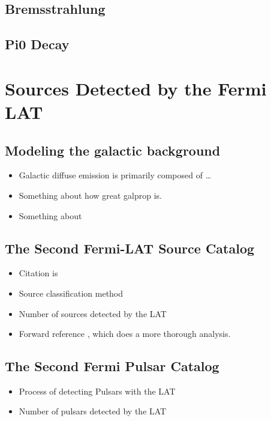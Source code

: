 \subsection{Bremsstrahlung}

\subsection{Pi0 Decay}

\section{Sources Detected by the Fermi LAT}

\subsection{Modeling the galactic background}

\begin{itemize}
  \item Galactic diffuse emission is primarily composed of \ldots
  \item Something about how great galprop is.
  \item Something about
\end{itemize}

\subsection{The Second Fermi-LAT Source Catalog}

\begin{itemize}
  \item Citation is \cite{second_lat_catalog_2012}
  \item Source classification method
  \item Number of sources detected by the LAT
  \item Forward reference ,
    which does a more thorough analysis.
\end{itemize}

\subsection{The Second Fermi Pulsar Catalog}

\begin{itemize}
  \item Process of detecting Pulsars with the LAT
  \item Number of pulsars detected by the LAT
\end{itemize}

